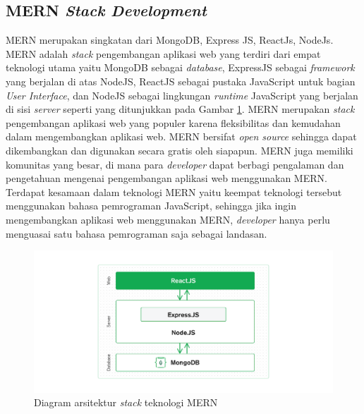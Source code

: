 \subsection{MERN \textit{Stack Development}}

MERN merupakan singkatan dari MongoDB, Express JS, ReactJs, NodeJs. 
MERN adalah \textit{stack} pengembangan aplikasi web yang terdiri dari empat 
teknologi utama yaitu MongoDB sebagai \textit{database}, ExpressJS sebagai \textit{framework} 
yang berjalan di atas NodeJS, ReactJS sebagai pustaka JavaScript untuk bagian \textit{User Interface}, 
dan NodeJS sebagai lingkungan \textit{runtime} JavaScript yang berjalan di sisi \textit{server} 
seperti yang ditunjukkan pada Gambar \ref{Fig:mern_visualization}. 
MERN merupakan \textit{stack} pengembangan aplikasi web yang populer karena fleksibilitas dan 
kemudahan dalam mengembangkan aplikasi web. MERN bersifat \textit{open source} 
sehingga dapat dikembangkan dan digunakan secara gratis oleh siapapun. MERN juga memiliki 
komunitas yang besar, di mana para \textit{developer} dapat berbagi pengalaman dan 
pengetahuan mengenai pengembangan aplikasi web menggunakan MERN. Terdapat kesamaan dalam 
teknologi MERN yaitu keempat teknologi tersebut menggunakan bahasa pemrograman JavaScript, 
sehingga jika ingin mengembangkan aplikasi web menggunakan MERN, \textit{developer} hanya
perlu menguasai satu bahasa pemrograman saja sebagai landasan\cite{badru_mern_2022}.

\begin{figure}[h]
	\centering
	\includegraphics[width=12cm]{contents/chapter-2/mern_visualization.png}
	\caption{Diagram arsitektur \textit{stack} teknologi MERN \cite{s_what_2021}}
	\label{Fig:mern_visualization}
\end{figure}


